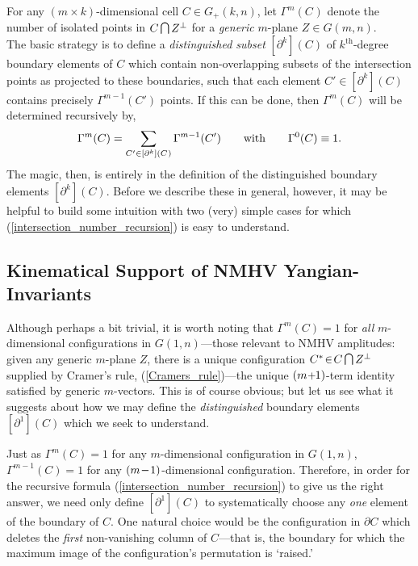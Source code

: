 \documentclass[12pt,hyperref,compress]{JHEP3}
\newcommand{\newcap}{{\small\mathrm{\raisebox{0.95pt}{{$\,\bigcap\,$}}}}}
\newcommand{\eq}[1]{\begin{equation}#1\end{equation}}
\newcommand{\mi}{{\rm\rule[2.4pt]{6pt}{0.65pt}}}
\newcommand{\pl}{\hspace{0.5pt}\text{{\small+}}\hspace{-0.5pt}}
\begin{document}
{ For any $(m\!\times\!k)$-dimensional cell $C\!\in\!G_+(k,n)$, let $\Gamma^m(C^{})$ denote the number of isolated points in $C\newcap Z^{\perp}$ for a {\it generic} $m$-plane $Z\!\in\!G(m,n)$. \\[-7pt]

The basic strategy is to define a {\it distinguished subset} $[\partial^k](C)$ of $k^{\mathrm{th}}$-degree boundary elements of $C$ which contain non-overlapping subsets of the intersection points as projected to these boundaries, such that each element $C'\in[\partial^k](C)$ contains precisely $\Gamma^{m-1}(C')$ points. If this can be done, then $\Gamma^m(C)$ will be determined recursively by,
\vspace{-.2cm}\eq{\Gamma^m(C)=\sum_{C'\in[\partial^k](C^{})}\Gamma^{m-1}(C')\qquad\mathrm{with}\qquad\Gamma^0(C)\equiv1.\label{intersection_number_recursion}\vspace{-.2cm}}
The magic, then, is entirely in the definition of the distinguished boundary elements $[\partial^k](C)$. Before we describe these in general, however, it may be helpful to build some intuition with two (very) simple cases for which (\ref{intersection_number_recursion}) is easy to understand.

\subsection{Kinematical Support of NMHV Yangian-Invariants}
Although perhaps a bit trivial, it is worth noting that $\Gamma^m(C)=1$ for {\it all} $m$-dimensional configurations in $G(1,n)$---those relevant to NMHV amplitudes: given any generic $m$-plane $Z$, there is a unique configuration $C^*\!\in\!C\newcap Z^{\perp}$ supplied by  Cramer's rule, (\ref{Cramers_rule})---the unique $(m\pl1)$-term identity satisfied by generic $m$-vectors. This is of course obvious; but let us see what it suggests about how we may define the {\it distinguished} boundary elements $[\partial^1](C)$ which we seek to understand.

Just as $\Gamma^m(C)=1$ for any $m$-dimensional configuration in $G(1,n)$, $\Gamma^{m-1}(C)=1$ for any $(m\,\mi\,1)$-dimensional configuration. Therefore, in order for the recursive formula (\ref{intersection_number_recursion}) to give us the right answer, we need only define $[\partial^1](C)$ to systematically choose any {\it one} element of the boundary of $C$. One natural choice would be the configuration in $\partial C$ which deletes the {\it first} non-vanishing column of $C$---that is, the boundary for which the maximum image of the configuration's permutation is `raised.'

}
\end{document}
